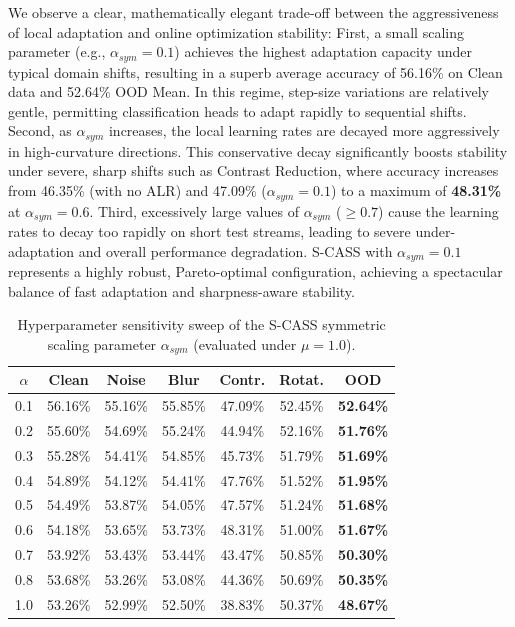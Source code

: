 \documentclass{article}
\theoremstyle{plain}
\theoremstyle{definition}
\theoremstyle{remark}
\begin{document}
We observe a clear, mathematically elegant trade-off between the aggressiveness of local adaptation and online optimization stability:
First, a small scaling parameter (e.g., $\alpha_{sym} = 0.1$) achieves the highest adaptation capacity under typical domain shifts, resulting in a superb average accuracy of 56.16\% on Clean data and 52.64\% OOD Mean. In this regime, step-size variations are relatively gentle, permitting classification heads to adapt rapidly to sequential shifts.
Second, as $\alpha_{sym}$ increases, the local learning rates are decayed more aggressively in high-curvature directions. This conservative decay significantly boosts stability under severe, sharp shifts such as Contrast Reduction, where accuracy increases from 46.35\% (with no ALR) and 47.09\% ($\alpha_{sym}=0.1$) to a maximum of \textbf{48.31\%} at $\alpha_{sym} = 0.6$.
Third, excessively large values of $\alpha_{sym}$ ($\ge 0.7$) cause the learning rates to decay too rapidly on short test streams, leading to severe under-adaptation and overall performance degradation. S-CASS with $\alpha_{sym} = 0.1$ represents a highly robust, Pareto-optimal configuration, achieving a spectacular balance of fast adaptation and sharpness-aware stability.

\begin{table}[t]
\caption{Hyperparameter sensitivity sweep of the S-CASS symmetric scaling parameter $\alpha_{sym}$ (evaluated under $\mu = 1.0$).}
\label{tab:alpha_sweep}
\vskip 0.15in
\begin{center}
\begin{footnotesize}
\begin{sc}
\setlength{\tabcolsep}{3.5pt}
\begin{tabular}{ccccccc}
\toprule
$\alpha$ & Clean & Noise & Blur & Contr. & Rotat. & OOD \\
\midrule
0.1 & 56.16\% & 55.16\% & 55.85\% & 47.09\% & 52.45\% & \textbf{52.64\%} \\
0.2 & 55.60\% & 54.69\% & 55.24\% & 44.94\% & 52.16\% & \textbf{51.76\%} \\
0.3 & 55.28\% & 54.41\% & 54.85\% & 45.73\% & 51.79\% & \textbf{51.69\%} \\
0.4 & 54.89\% & 54.12\% & 54.41\% & 47.76\% & 51.52\% & \textbf{51.95\%} \\
0.5 & 54.49\% & 53.87\% & 54.05\% & 47.57\% & 51.24\% & \textbf{51.68\%} \\
0.6 & 54.18\% & 53.65\% & 53.73\% & 48.31\% & 51.00\% & \textbf{51.67\%} \\
0.7 & 53.92\% & 53.43\% & 53.44\% & 43.47\% & 50.85\% & \textbf{50.30\%} \\
0.8 & 53.68\% & 53.26\% & 53.08\% & 44.36\% & 50.69\% & \textbf{50.35\%} \\
1.0 & 53.26\% & 52.99\% & 52.50\% & 38.83\% & 50.37\% & \textbf{48.67\%} \\
\bottomrule
\end{tabular}
\end{sc}
\end{footnotesize}
\end{center}
\vskip -0.1in
\end{table}
\end{document}
